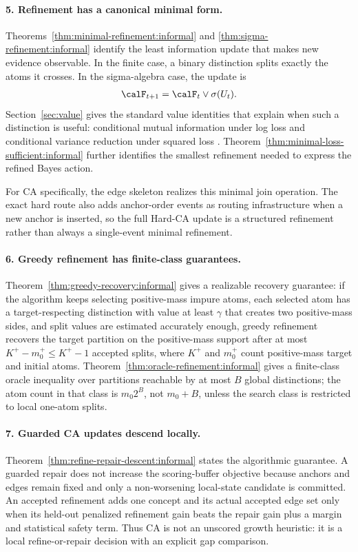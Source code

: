 \paragraph{5. Refinement has a canonical minimal form.}
Theorems~\ref{thm:minimal-refinement:informal} and \ref{thm:sigma-refinement:informal} identify the least information update that makes new evidence observable. In the finite case, a binary distinction splits exactly the atoms it crosses. In the sigma-algebra case, the update is
\begin{align*}
\calF_{t+1}=\calF_t\vee\sigma(U_t).
\end{align*}
Section~\ref{sec:value} gives the standard value identities that explain when such a distinction is useful: conditional mutual information under log loss and conditional variance reduction under squared loss \citep{cover2006elements,gneiting2007strictly,billingsley1995probability,kallenberg2002foundations}. Theorem~\ref{thm:minimal-loss-sufficient:informal} further identifies the smallest refinement needed to express the refined Bayes action.

For CA specifically, the edge skeleton realizes this minimal join operation. The exact hard route also adds anchor-order events as routing infrastructure when a new anchor is inserted, so the full Hard-CA update is a structured refinement rather than always a single-event minimal refinement.

\paragraph{6. Greedy refinement has finite-class guarantees.}
Theorem~\ref{thm:greedy-recovery:informal} gives a realizable recovery guarantee: if the algorithm keeps selecting positive-mass impure atoms, each selected atom has a target-respecting distinction with value at least $\gamma$ that creates two positive-mass sides, and split values are estimated accurately enough, greedy refinement recovers the target partition on the positive-mass support after at most $K^+-m_0^+\le K^+-1$ accepted splits, where $K^+$ and $m_0^+$ count positive-mass target and initial atoms. Theorem~\ref{thm:oracle-refinement:informal} gives a finite-class oracle inequality over partitions reachable by at most $B$ global distinctions; the atom count in that class is $m_0 2^B$, not $m_0+B$, unless the search class is restricted to local one-atom splits.

\paragraph{7. Guarded CA updates descend locally.}
Theorem~\ref{thm:refine-repair-descent:informal} states the algorithmic guarantee. A guarded repair does not increase the scoring-buffer objective because anchors and edges remain fixed and only a non-worsening local-state candidate is committed. An accepted refinement adds one concept and its actual accepted edge set only when its held-out penalized refinement gain beats the repair gain plus a margin and statistical safety term. Thus CA is not an unscored growth heuristic: it is a local refine-or-repair decision with an explicit gap comparison.

